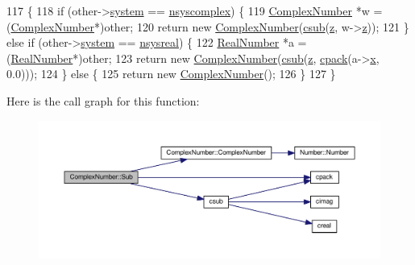 \begin{DoxyCode}
117 \{
118     \textcolor{keywordflow}{if} (other->\hyperlink{structNumber_a2ceda5601c42288626e76b06878e7476}{system} == \hyperlink{numb_8h_a1475a201d2346881ce88dfbacf628c7da3b38c947375a3db3a4bc184a11c8ee42}{nsyscomplex}) \{
119         \hyperlink{structComplexNumber}{ComplexNumber} *w = (\hyperlink{structComplexNumber}{ComplexNumber}*)other;
120         \textcolor{keywordflow}{return} \textcolor{keyword}{new} \hyperlink{structComplexNumber_a610e9db9ff0ddb0140e30d235ab64e44}{ComplexNumber}(\hyperlink{complex_8h_a46bb0dd64d87c3aeb85417d1dadf6ddd}{csub}(\hyperlink{structComplexNumber_a5f72da71f4ce0d88076a391369239042}{z}, w->\hyperlink{structComplexNumber_a5f72da71f4ce0d88076a391369239042}{z}));
121     \} \textcolor{keywordflow}{else}  \textcolor{keywordflow}{if} (other->\hyperlink{structNumber_a2ceda5601c42288626e76b06878e7476}{system} == \hyperlink{numb_8h_a1475a201d2346881ce88dfbacf628c7dae72cf8673109b15268d1c0837e8bff86}{nsysreal}) \{
122         \hyperlink{structRealNumber}{RealNumber} *a = (\hyperlink{structRealNumber}{RealNumber}*)other;
123         \textcolor{keywordflow}{return} \textcolor{keyword}{new} \hyperlink{structComplexNumber_a610e9db9ff0ddb0140e30d235ab64e44}{ComplexNumber}(\hyperlink{complex_8h_a46bb0dd64d87c3aeb85417d1dadf6ddd}{csub}(\hyperlink{structComplexNumber_a5f72da71f4ce0d88076a391369239042}{z}, \hyperlink{complex_8h_a980e6e049f7902b05fc9eb5614b07a5c}{cpack}(a->\hyperlink{structRealNumber_ac33d80bee75448490199a0aa48ccce1e}{x}, 0.0)));
124     \} \textcolor{keywordflow}{else} \{
125         \textcolor{keywordflow}{return} \textcolor{keyword}{new} \hyperlink{structComplexNumber_a610e9db9ff0ddb0140e30d235ab64e44}{ComplexNumber}();
126     \}
127 \}
\end{DoxyCode}


Here is the call graph for this function\+:\nopagebreak
\begin{figure}[H]
\begin{center}
\leavevmode
\includegraphics[width=350pt]{structComplexNumber_a8f196f990620e30495f69338a1e40316_cgraph}
\end{center}
\end{figure}


